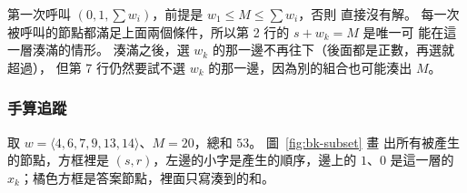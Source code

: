第一次呼叫 $(0, 1, \sum w_i)$，前提是 $w_1 \le M \le \sum w_i$，否則
直接沒有解。 每一次被呼叫的節點都滿足上面兩個條件，所以第 2 行的 $s + w_k = M$ 是唯一可
能在這一層湊滿的情形。 湊滿之後，選 $w_k$ 的那一邊不再往下（後面都是正數，再選就超過），
但第 7 行仍然要試不選 $w_k$ 的那一邊，因為別的組合也可能湊出 $M$。

\subsubsection{手算追蹤}

取 $w = \langle 4, 6, 7, 9, 13, 14 \rangle$、$M = 20$，總和 $53$。 圖~\ref{fig:bk-subset} 畫
出所有被產生的節點，方框裡是 $(s, r)$，左邊的小字是產生的順序，邊上的 $1$、$0$ 是這一層的
$x_k$；橘色方框是答案節點，裡面只寫湊到的和。

